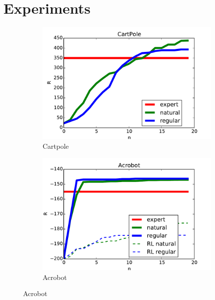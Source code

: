 \documentclass{article}
\begin{document}
\section{Experiments}
\begin{figure}[t!]
	\centering
	\vspace{-2mm}
	\begin{subfigure}[l]{0.1962\textwidth}
        \includegraphics[width=1.12\textwidth,keepaspectratio]{./figure/CartPole_comparison.pdf}
        \caption{Cartpole}
        \label{fig:cartpole}
    \end{subfigure}
	\begin{subfigure}[l]{0.1962\textwidth}
        \includegraphics[width=1.12\textwidth,keepaspectratio]{./figure/Acrobot_comparison_200.pdf}
        \caption{Acrobot}
        \label{fig:acrobot}
    \end{subfigure}

\end{figure}
\end{document}
